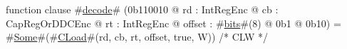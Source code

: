 function clause #\hyperref[sailMIPSzdecode]{decode}# (0b110010 @ rd : IntRegEnc @ cb : CapRegOrDDCEnc @ rt : IntRegEnc @ offset : #\hyperref[sailMIPSzbits]{bits}#(8) @ 0b1 @ 0b10) = #\hyperref[sailMIPSzSome]{Some}#(#\hyperref[sailMIPSzCLoad]{CLoad}#(rd, cb, rt, offset, true,  W)) /* CLW */
